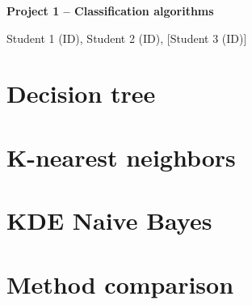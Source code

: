 \documentclass[10pt,a4paper]{article}
\newcommand{\StudentNames}{Student 1 (ID), Student 2 (ID), [Student 3 (ID)]}
\begin{document}
\begin{center}
  {\large\bfseries Project 1 -- Classification algorithms}\par
  {\small\StudentNames}
\end{center}

\section{Decision tree}
\subsection{}

\subsection{}

\section{K-nearest neighbors}
\subsection{}

\subsection{}

\section{KDE Naive Bayes}
\subsection{}

\subsection{}

\subsection{}

\subsection{}

\section{Method comparison}
\end{document}
